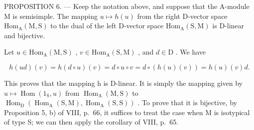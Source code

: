 PROPOSITION 6. --- Keep the notation above, and suppose that the A-module M is semisimple. The mapping \(u \mapsto h(u)\) from the right D-vector space \(\mathrm{Hom}_{\mathrm{A}}(\mathrm{M},\mathrm{S})\) to the dual of the left D-vector space \(\mathrm{Hom}_{\mathrm{A}}(\mathrm{S},\mathrm{M})\) is D-linear and bijective.

Let \(u \in \mathrm{Hom}_{\mathrm{A}}(\mathrm{M}, \mathrm{S})\) , \(v \in \mathrm{Hom}_{\mathrm{A}}(\mathrm{S}, \mathrm{M})\) , and \(d \in \mathrm{D}\) . We have

\[
h (u d) (v) = h (d \circ u) (v) = d \circ u \circ v = d \circ (h (u) (v)) = h (u) (v) d.
\]

This proves that the mapping h is D-linear. It is simply the mapping given by \(u \mapsto \operatorname{Hom}(1_{\mathrm{S}}, u)\) from \(\operatorname{Hom}_{\mathrm{A}}(\mathrm{M}, \mathrm{S})\) to \(\operatorname{Hom}_{\mathrm{D}}(\operatorname{Hom}_{\mathrm{A}}(\mathrm{S}, \mathrm{M}), \operatorname{Hom}_{\mathrm{A}}(\mathrm{S}, \mathrm{S}))\) . To prove that it is bijective, by Proposition 5, b) of VIII, p.~66, it suffices to treat the case when M is isotypical of type S; we can then apply the corollary of VIII, p.~65.

